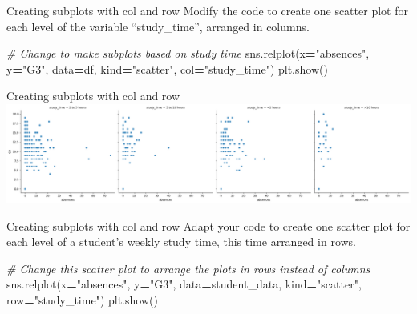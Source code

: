 \documentclass[
  ignorenonframetext,
]{beamer}
\newenvironment{Shaded}{\begin{snugshade}}{\end{snugshade}}
\newcommand{\CommentTok}[1]{\textcolor[rgb]{0.56,0.35,0.01}{\textit{#1}}}
\newcommand{\NormalTok}[1]{#1}
\newcommand{\OperatorTok}[1]{\textcolor[rgb]{0.81,0.36,0.00}{\textbf{#1}}}
\newcommand{\StringTok}[1]{\textcolor[rgb]{0.31,0.60,0.02}{#1}}
\begin{document}
\begin{frame}[fragile]{Creating subplots with col and row}
\label{creating-subplots-with-col-and-row-5}
Modify the code to create one scatter plot for each level of the
variable ``study\_time'', arranged in columns.


\begin{Shaded}
\begin{Highlighting}[]
\CommentTok{\# Change to make subplots based on study time}
\NormalTok{sns.relplot(x}\OperatorTok{=}\StringTok{"absences"}\NormalTok{, y}\OperatorTok{=}\StringTok{"G3"}\NormalTok{, }
\NormalTok{            data}\OperatorTok{=}\NormalTok{df,}
\NormalTok{            kind}\OperatorTok{=}\StringTok{"scatter"}\NormalTok{,}
\NormalTok{            col}\OperatorTok{=}\StringTok{"study\_time"}\NormalTok{)}
\NormalTok{plt.show()}
            
\end{Highlighting}
\end{Shaded}
\end{frame}

\begin{frame}{Creating subplots with col and row}
\label{creating-subplots-with-col-and-row-6}
\includegraphics{../images/im263.png}
\end{frame}

\begin{frame}[fragile]{Creating subplots with col and row}
\label{creating-subplots-with-col-and-row-7}
Adapt your code to create one scatter plot for each level of a student's
weekly study time, this time arranged in rows.


\begin{Shaded}
\begin{Highlighting}[]
\CommentTok{\# Change this scatter plot to arrange the plots in rows instead of columns}
\NormalTok{sns.relplot(x}\OperatorTok{=}\StringTok{"absences"}\NormalTok{, y}\OperatorTok{=}\StringTok{"G3"}\NormalTok{, }
\NormalTok{            data}\OperatorTok{=}\NormalTok{student\_data,}
\NormalTok{            kind}\OperatorTok{=}\StringTok{"scatter"}\NormalTok{, }
\NormalTok{            row}\OperatorTok{=}\StringTok{"study\_time"}\NormalTok{)}
\NormalTok{plt.show()}
\end{Highlighting}
\end{Shaded}
\end{frame}
\end{document}
